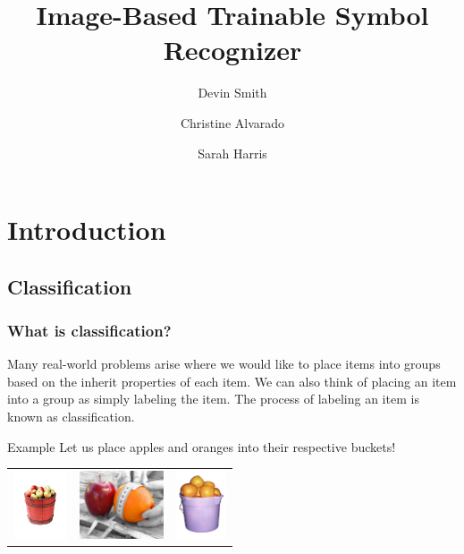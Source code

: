 \documentclass{beamer}
\title{
Image-Based Trainable Symbol Recognizer}
\author{
Devin Smith\\
\and 
Christine Alvarado\\
\and
Sarah Harris}
\institute{
Department of Computer Science\\
Harvey Mudd College}
\begin{document}
\begin{frame}
\titlepage
\end{frame}


\section{Introduction}
\subsection{Classification}

\begin{frame}
\frametitle{What is classification?}
Many real-world problems arise where we would like to place items into groups based on the inherit properties of each item.
We can also think of placing an item into a group as simply labeling the item.
The process of labeling an item is known as classification.

\begin{exampleblock}{Example}
\small{
Let us place apples and oranges into their respective buckets!\\}
\begin{center}
\begin{tabular}{ccc}
\includegraphics[height=2cm]{applebucket.png}&
\includegraphics[height=2cm]{appleorange.jpg}&
\includegraphics[height=2cm]{orangebucket.png}
\end{tabular}
\end{center}
\end{exampleblock}
\end{frame}
\end{document}
